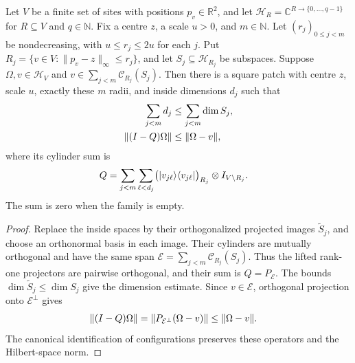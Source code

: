 \begin{theorem}
    \label{thm:peps_nested_cylinder_square_patch}
    Let $V$ be a finite set of sites with positions $p_v\in\mathbb R^2$, and let
    $\mathcal H_R=\mathbb C^{R\to\{0,\ldots,q-1\}}$ for $R\subseteq V$ and $q\in\mathbb N$.
    Fix a centre $z$, a scale $u>0$, and $m\in\mathbb N$.
    Let $(r_j)_{0\leq j<m}$ be nondecreasing, with $u\leq r_j\leq2u$ for each $j$.
    Put $R_j=\{v\in V:\|p_v-z\|_\infty\leq r_j\}$, and let
    $S_j\subseteq\mathcal H_{R_j}$ be subspaces.
    Suppose $\Omega,v\in\mathcal H_V$ and
    $v\in\sum_{j<m}\mathcal C_{R_j}(S_j)$.
    Then there is a square patch with centre $z$, scale $u$, exactly these
    $m$ radii, and inside dimensions $d_j$ such that
    \begin{align}
        \sum_{j<m}d_j   & \leq\sum_{j<m}\dim S_j, \notag \\
        \|(I-Q)\Omega\| & \leq\|\Omega-v\|, \notag
    \end{align}
    where its cylinder sum is
    \begin{align}
        Q & =\sum_{j<m}\sum_{\ell<d_j}
        \bigl(\lvert v_{j\ell}\rangle\langle v_{j\ell}\rvert\bigr)_{R_j}
        \otimes I_{V\setminus R_j}. \notag
    \end{align}
    The sum is zero when the family is empty.
\end{theorem}
\begin{proof}
    Replace the inside spaces by their orthogonalized projected images
    $\widetilde S_j$, and choose an orthonormal basis in each image.
    Their cylinders are mutually orthogonal and have the same span
    $\mathcal E=\sum_{j<m}\mathcal C_{R_j}(S_j)$.
    Thus the lifted rank-one projectors are pairwise orthogonal, and their
    sum is $Q=P_{\mathcal E}$.
    The bounds $\dim\widetilde S_j\leq\dim S_j$ give the dimension estimate.
    Since $v\in\mathcal E$, orthogonal projection onto $\mathcal E^\perp$ gives
    \begin{align}
        \|(I-Q)\Omega\|
         & =\|P_{\mathcal E^\perp}(\Omega-v)\|
        \leq\|\Omega-v\|. \notag
    \end{align}
    The canonical identification of configurations preserves these operators
    and the Hilbert-space norm.
\end{proof}
